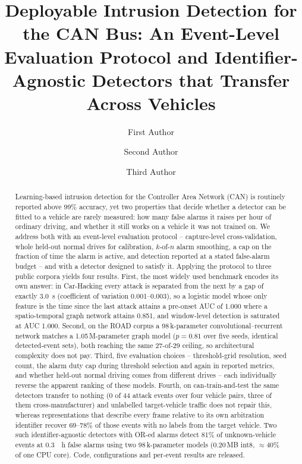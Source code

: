 \documentclass[preprint,11pt,authoryear]{elsarticle}
\begin{document}
\begin{frontmatter}

\title{Deployable Intrusion Detection for the CAN Bus: An Event-Level Evaluation
Protocol and Identifier-Agnostic Detectors that Transfer Across Vehicles}

\author[a]{First Author}
\author[a]{Second Author}
\author[a]{Third Author}

\begin{abstract}
Learning-based intrusion detection for the Controller Area Network (CAN) is routinely reported
above 99\% accuracy, yet two properties that decide whether a detector can be fitted to a vehicle
are rarely measured: how many false alarms it raises per hour of ordinary driving, and whether it
still works on a vehicle it was not trained on. We address both with an event-level evaluation
protocol -- capture-level cross-validation, whole held-out normal drives for calibration, $k$-of-$n$
alarm smoothing, a cap on the fraction of time the alarm is active, and detection reported at a
stated false-alarm budget -- and with a detector designed to satisfy it. Applying the protocol to
three public corpora yields four results. First, the most widely used benchmark encodes its own
answer: in Car-Hacking every attack is separated from the next by a gap of exactly
\SI{3.0}{\second} (coefficient of variation 0.001--0.003), so a logistic model whose only feature is
the time since the last attack attains a pre-onset AUC of 1.000 where a spatio-temporal graph
network attains 0.851, and window-level detection is saturated at AUC 1.000. Second, on the ROAD
corpus a 98\,k-parameter convolutional--recurrent network matches a 1.05\,M-parameter graph model
($p=0.81$ over five seeds, identical detected-event sets), both reaching the same 27-of-29 ceiling,
so architectural complexity does not pay. Third, five evaluation choices -- threshold-grid
resolution, seed count, the alarm duty cap during threshold selection and again in reported metrics,
and whether held-out normal driving comes from different drives -- each individually reverse the
apparent ranking of these models. Fourth, on can-train-and-test the same detectors transfer to
nothing (0 of 44 attack events over four vehicle pairs, three of them cross-manufacturer) and
unlabelled target-vehicle traffic does not repair this, whereas representations that describe every
frame relative to its own arbitration identifier recover 69--78\% of those events with no labels
from the target vehicle. Two such identifier-agnostic detectors with OR-ed alarms detect 81\% of
unknown-vehicle events at \SI{0.3}{\per\hour} false alarms using two 98\,k-parameter models
(0.20\,MB int8, $\approx$40\% of one CPU core). Code, configurations and per-event results are
released.
\end{abstract}


\end{frontmatter}
\end{document}
